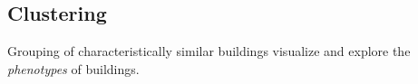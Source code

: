 \subsection{Clustering}
\label{sec:clustering}

Grouping of characteristically similar buildings visualize and explore the \emph{phenotypes} of buildings.